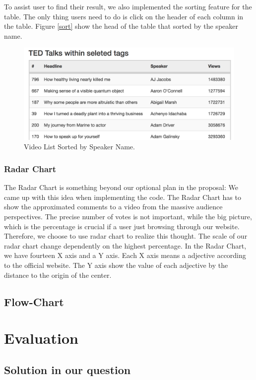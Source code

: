\documentclass{report}
\numberwithin{figure}{section}
\begin{document}
To assist user to find their result, we also implemented the sorting feature for the table. The only thing users need to do is click on the header of each column in the table. Figure \ref{sort} show the head of the table that sorted by the speaker name.

\begin{figure}
\begin{center}
\includegraphics[scale=0.6]{sort}
\caption{Video List Sorted by Speaker Name.}
\label{fig:sort}
\end{center}
\end{figure}

\subsection{Radar Chart}
\quad The Radar Chart is something beyond our optional plan in the proposal: We came up with this idea when implementing the code. The Radar Chart has to show the approximated comments to a video from the massive audience perspectives. The precise number of votes is not important, while the big picture, which is the percentage is crucial if a user just browsing through our website. Therefore, we choose to use radar chart to realize this thought. The scale of our radar chart change dependently on the highest percentage.
 In the Radar Chart, we have fourteen X axis and a Y axis. Each X axis means a adjective according to the official website. The Y axis show the value of each adjective by the distance to the origin of the center.

\section{Flow-Chart}

\chapter{Evaluation}
\section{Solution in our question}
 


\end{document}
